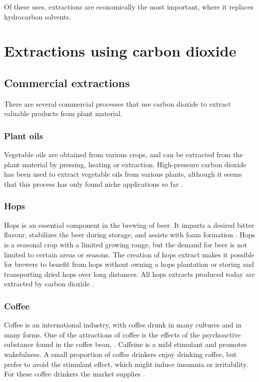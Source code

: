 Of these uses, extractions are economically the most important, where it
replaces hydrocarbon solvents.

\section{Extractions using carbon dioxide}

\subsection{Commercial extractions}

There are several commercial processes that use carbon dioxide to extract
valuable products from plant material.

\subsubsection{Plant oils}

Vegetable oils are obtained from various crops, and can be extracted from the
plant material by pressing, heating or extraction. High-pressure carbon dioxide
has been used to extract vegetable oils from various plants, although it seems
that this process has only found niche applications so far
\autocite{Eisenmenger2006,Grazyna2018}.

\subsubsection{Hops}

Hops is an essential component in the brewing of beer. It imparts a desired
bitter flavour, stabilizes the beer during storage, and assists with foam
formation \autocite{Schoenberger2011}. Hops is a seasonal crop with a limited
growing range, but the demand for beer is not limited to certain areas or
seasons. The creation of hops extract makes it possible for brewers to benefit from 
hops without owning a hops plantation or storing and transporting dried hops
over long distances. All hops extracts produced today are extracted by carbon
dioxide \autocite{Hunt2010}.

\subsubsection{Coffee}

Coffee is an international industry, with coffee drunk in many cultures and in
many forms. One of the attractions of coffee is the effects of the psychoactive
substance found in the coffee bean, . Caffeine is a mild
stimulant and promotes wakefulness. A small proportion of coffee drinkers enjoy
drinking coffee, but prefer to avoid the stimulant effect, which might induce
insomnia or irritability. For these coffee drinkers the market supplies
.

